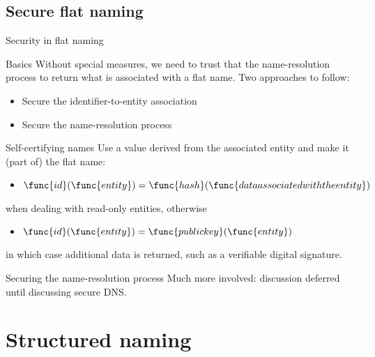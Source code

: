 \subsection{Secure flat naming}
\begin{slide}{Security in flat naming}

  \begin{block}{Basics}
    Without special measures, we need to trust that the name-resolution process to return what is associated
    with a flat name. Two approaches to follow:
    \begin{itemize}
    \item Secure the identifier-to-entity association
    \item Secure the name-resolution process
    \end{itemize}
  \end{block}
  
  \begin{block}{Self-certifying names}
    Use a value derived from the associated entity and make it (part of) the flat name:
    \begin{itemize}
    \item \( \func{id}(\func{entity}) = \func{hash}(\func{data associated with the entity}) \)
    \end{itemize}
    when dealing with read-only entities, otherwise
    \begin{itemize}
    \item \( \func{id}(\func{entity}) = \func{public key}(\func{entity}) \)
    \end{itemize}
    in which case additional data is returned, such as a verifiable digital signature.
  \end{block}

  \begin{alertblock}{Securing the name-resolution process}
    Much more involved: discussion deferred until discussing secure DNS.
  \end{alertblock}
  
\end{slide}
\section{Structured naming}

